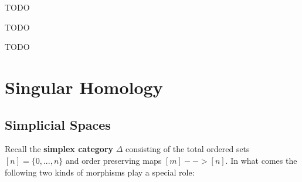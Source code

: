 	\begin{lemma}
		TODO
	\end{lemma}

	\begin{lemma}
		TODO
	\end{lemma}

	\begin{lemma}
		TODO
	\end{lemma}


	\newpage
	\section{Singular Homology}
	\subsection{Simplicial Spaces}

	Recall the \textbf{simplex category} $\Delta$ consisting of the total ordered sets $[n] = \{0,...,n\}$ and order preserving maps $[m] --> [n]$. In what comes the following two kinds of morphisms play a special role:

